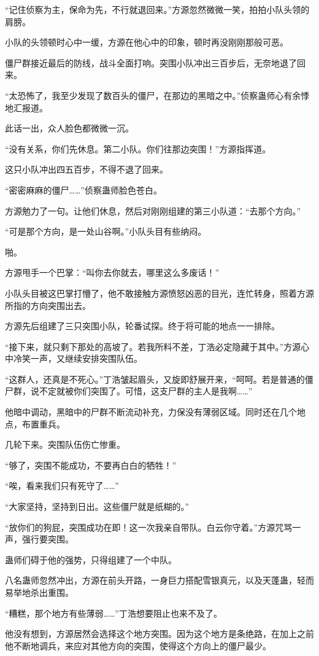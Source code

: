 \begin{this_body}
“记住侦察为主，保命为先，不行就退回来。”方源忽然微微一笑，拍拍小队头领的肩膀。

小队的头领顿时心中一缓，方源在他心中的印象，顿时再没刚刚那般可恶。

僵尸群接近最后的防线，战斗全面打响。突围小队冲出三百步后，无奈地退了回来。

“太恐怖了，我至少发现了数百头的僵尸，在那边的黑暗之中。”侦察蛊师心有余悸地汇报道。

此话一出，众人脸色都微微一沉。

“没有关系，你们先休息。第二小队。你们往那边突围！”方源指挥道。

这只小队冲出四五百步，不得不退了回来。

“密密麻麻的僵尸……”侦察蛊师脸色苍白。

方源勉力了一句。让他们休息，然后对刚刚组建的第三小队道：“去那个方向。”

“可是那个方向，是一处山谷啊。”小队头目有些纳闷。

啪。

方源甩手一个巴掌：“叫你去你就去，哪里这么多废话！”

小队头目被这巴掌打懵了，他不敢接触方源愤怒凶恶的目光，连忙转身，照着方源所指的方向突围出去。

方源先后组建了三只突围小队，轮番试探。终于将可能的地点一一排除。

“接下来，就只剩下那处的高坡了。若我所料不差，丁浩必定隐藏于其中。”方源心中冷笑一声，又继续安排突围队伍。

“这群人，还真是不死心。”丁浩皱起眉头，又旋即舒展开来，“呵呵。若是普通的僵尸群，说不定就被你们突围了。可惜，这支尸群的主人是我啊……”

他暗中调动，黑暗中的尸群不断流动补充，力保没有薄弱区域。同时还在几个地点，布置重兵。

几轮下来。突围队伍伤亡惨重。

“够了，突围不能成功，不要再白白的牺牲！”

“唉，看来我们只有死守了……”

“大家坚持，坚持到日出。这些僵尸就是纸糊的。”

“放你们的狗屁，突围成功在即！这一次我亲自带队。白云你守着。”方源咒骂一声，强行要突围。

蛊师们碍于他的强势，只得组建了一个中队。

八名蛊师忽然冲出，方源在前头开路，一身巨力搭配雪银真元，以及天蓬蛊，轻而易举地杀出重围。

“糟糕，那个地方有些薄弱……”丁浩想要阻止也来不及了。

他没有想到，方源居然会选择这个地方突围。因为这个地方是条绝路，在加上之前他不断地调兵，来应对其他方向的突围，使得这个方向上的僵尸最少。


\end{this_body}
